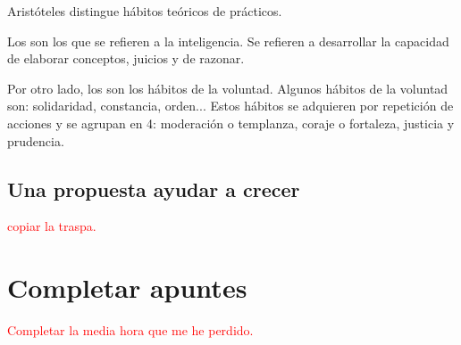 \documentclass[palatino]{apuntesURJC}
\begin{document}
Aristóteles distingue hábitos teóricos de prácticos.

Los   son los que se refieren a la inteligencia. Se refieren a  desarrollar la capacidad de elaborar conceptos, juicios y de razonar. 

Por otro lado, los  son los hábitos de la voluntad.
%
Algunos hábitos de la voluntad son: solidaridad, constancia, orden... 
%
Estos hábitos se adquieren por repetición de acciones y se agrupan en 4: moderación o templanza, coraje o fortaleza, justicia y prudencia.


\subsection{Una propuesta ayudar a crecer}

\textcolor{red}{copiar la traspa.}

\section{Completar apuntes}

\textcolor{red}{Completar la media hora que me he perdido.}
\end{document}
